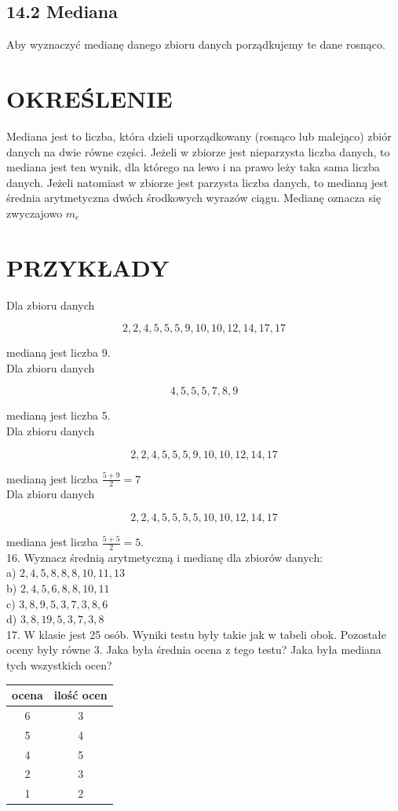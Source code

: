 \documentclass[10pt]{article}
\begin{document}
\subsection*{14.2 Mediana}
Aby wyznaczyć medianę danego zbioru danych porządkujemy te dane rosnąco.

\section*{OKREŚLENIE}
Mediana jest to liczba, która dzieli uporządkowany (rosnąco lub malejąco) zbiór danych na dwie równe części. Jeżeli w zbiorze jest nieparzysta liczba danych, to mediana jest ten wynik, dla którego na lewo i na prawo leży taka sama liczba danych. Jeżeli natomiast w zbiorze jest parzysta liczba danych, to medianą jest średnia arytmetyczna dwóch środkowych wyrazów ciągu. Medianę oznacza się zwyczajowo \(m_{e}\)

\section*{PRZYKŁADY}
Dla zbioru danych

\[
2,2,4,5,5,5,9,10,10,12,14,17,17
\]

medianą jest liczba 9.\\
Dla zbioru danych

\[
4,5,5,5,7,8,9
\]

medianą jest liczba 5.\\
Dla zbioru danych

\[
2,2,4,5,5,5,9,10,10,12,14,17
\]

medianą jest liczba \(\frac{5+9}{2}=7\)\\
Dla zbioru danych

\[
2,2,4,5,5,5,5,10,10,12,14,17
\]

mediana jest liczba \(\frac{5+5}{2}=5\).\\
16. Wyznacz średnią arytmetyczną i medianę dla zbiorów danych:\\
a) \(2,4,5,8,8,8,10,11,13\)\\
b) \(2,4,5,6,8,8,10,11\)\\
c) \(3,8,9,5,3,7,3,8,6\)\\
d) \(3,8,19,5,3,7,3,8\)\\
17. W klasie jest 25 osób. Wyniki testu były takie jak w tabeli obok. Pozostałe oceny były równe 3. Jaka była średnia ocena z tego testu? Jaka była mediana tych wszystkich ocen?

\begin{center}
\begin{tabular}{c|c}
ocena & ilość ocen \\
\hline
6 & 3 \\
5 & 4 \\
4 & 5 \\
2 & 3 \\
1 & 2 \\
\end{tabular}
\end{center}
\end{document}
